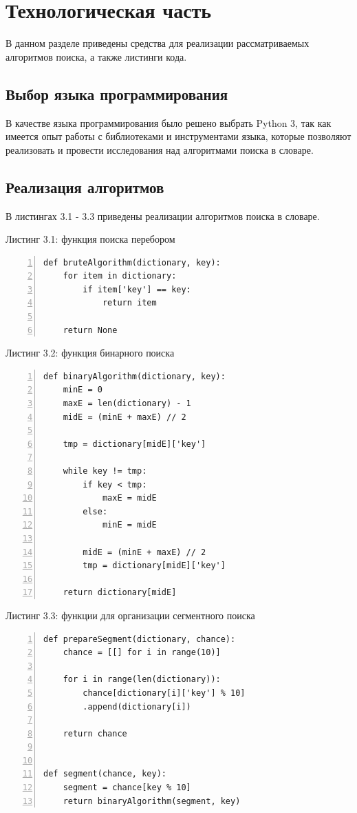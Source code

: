 \documentclass[12pt,a4paper]{report}
\begin{document}
\newpage
\chapter{Технологическая часть} 

В данном разделе приведены средства для реализации рассматриваемых алгоритмов поиска, а также 
листинги кода.

\section{Выбор языка программирования}

В качестве языка программирования было решено выбрать Python 3, так как имеется опыт работы с библиотеками и 
инструментами языка, которые позволяют реализовать и провести исследования над алгоритмами поиска в словаре.

\section{Реализация алгоритмов}

В листингах 3.1 - 3.3 приведены реализации алгоритмов поиска в словаре.

\textrm{Листинг 3.1: функция поиска перебором}
\begin{lstlisting}[frame=single, numbers=left]
def bruteAlgorithm(dictionary, key):
    for item in dictionary:
        if item['key'] == key:
            return item

    return None
\end{lstlisting}

\textrm{Листинг 3.2: функция бинарного поиска}
\begin{lstlisting}[frame=single, numbers=left]
def binaryAlgorithm(dictionary, key):
    minE = 0
    maxE = len(dictionary) - 1
    midE = (minE + maxE) // 2

    tmp = dictionary[midE]['key']

    while key != tmp:
        if key < tmp:
            maxE = midE
        else:
            minE = midE

        midE = (minE + maxE) // 2
        tmp = dictionary[midE]['key']

    return dictionary[midE]
\end{lstlisting}

\textrm{Листинг 3.3: функции для организации сегментного поиска}
\begin{lstlisting}[frame=single, numbers=left]
def prepareSegment(dictionary, chance):
    chance = [[] for i in range(10)]

    for i in range(len(dictionary)):
        chance[dictionary[i]['key'] % 10]
        .append(dictionary[i])
    
    return chance


def segment(chance, key):
    segment = chance[key % 10]
    return binaryAlgorithm(segment, key)
\end{lstlisting}
\end{document}
